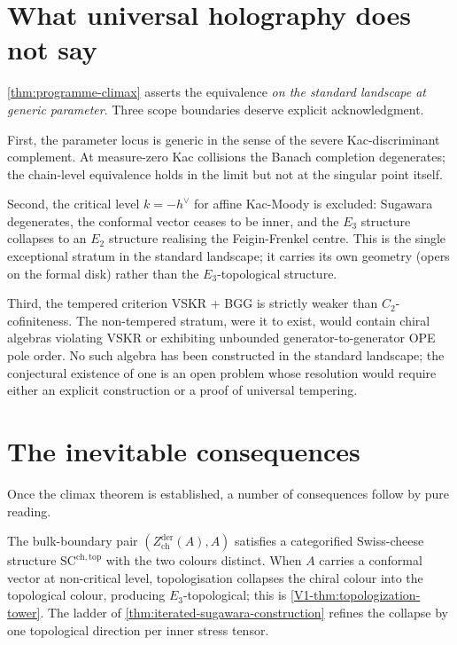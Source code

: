 \section{What universal holography does not say}
\label{sec:climax-limits}

\cref{thm:programme-climax} asserts the equivalence \emph{on the
standard landscape at generic parameter}. Three scope boundaries
deserve explicit acknowledgment.

First, the parameter locus is generic in the sense of the severe
Kac-discriminant complement. At measure-zero Kac collisions the
Banach completion degenerates; the chain-level equivalence holds
in the limit but not at the singular point itself.

Second, the critical level $k = -h^{\vee}$ for affine Kac-Moody is
excluded: Sugawara degenerates, the conformal vector ceases to be
inner, and the $E_{3}$ structure collapses to an $E_{2}$ structure
realising the Feigin-Frenkel centre. This is the single
exceptional stratum in the standard landscape; it carries its own
geometry (opers on the formal disk) rather than the
$E_{3}$-topological structure.

Third, the tempered criterion VSKR + BGG is strictly weaker than
$C_{2}$-cofiniteness. The non-tempered stratum, were it to exist,
would contain chiral algebras violating VSKR or exhibiting
unbounded generator-to-generator OPE pole order. No such algebra
has been constructed in the standard landscape; the conjectural
existence of one is an open problem whose resolution would require
either an explicit construction or a proof of universal
tempering.

\section{The inevitable consequences}
\label{sec:climax-consequences}

Once the climax theorem is established, a number of consequences
follow by pure reading.

The bulk-boundary pair $(Z^{\mathrm{der}}_{\mathrm{ch}}(A), A)$
satisfies a categorified Swiss-cheese structure
$\mathrm{SC}^{\mathrm{ch},\mathrm{top}}$ with the two colours
distinct. When $A$ carries a conformal vector at non-critical level,
topologisation collapses the chiral colour into the topological
colour, producing $E_{3}$-topological; this is
\cref{V1-thm:topologization-tower}. The ladder of
\cref{thm:iterated-sugawara-construction} refines the collapse by
one topological direction per inner stress tensor.

